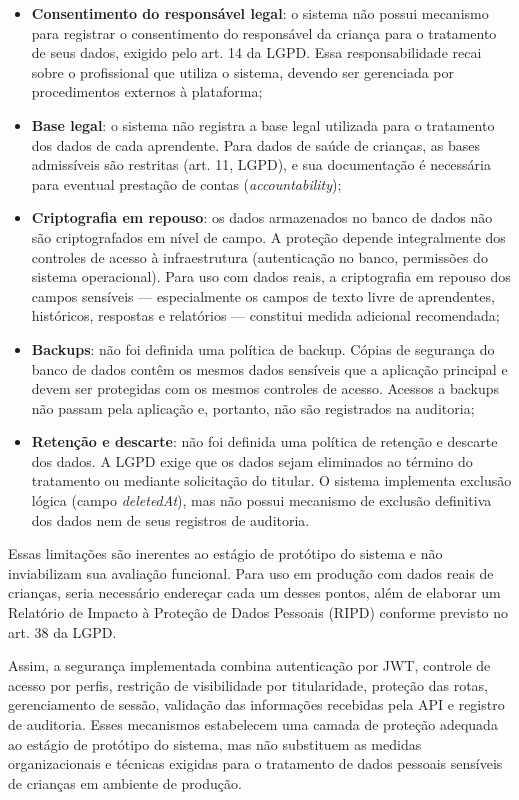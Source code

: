 \begin{itemize}
    \item \textbf{Consentimento do responsável legal}: o sistema não possui mecanismo para registrar o consentimento do responsável da criança para o tratamento de seus dados, exigido pelo art. 14 da LGPD. Essa responsabilidade recai sobre o profissional que utiliza o sistema, devendo ser gerenciada por procedimentos externos à plataforma;
    \item \textbf{Base legal}: o sistema não registra a base legal utilizada para o tratamento dos dados de cada aprendente. Para dados de saúde de crianças, as bases admissíveis são restritas (art. 11, LGPD), e sua documentação é necessária para eventual prestação de contas (\textit{accountability});
    \item \textbf{Criptografia em repouso}: os dados armazenados no banco de dados não são criptografados em nível de campo. A proteção depende integralmente dos controles de acesso à infraestrutura (autenticação no banco, permissões do sistema operacional). Para uso com dados reais, a criptografia em repouso dos campos sensíveis — especialmente os campos de texto livre de aprendentes, históricos, respostas e relatórios — constitui medida adicional recomendada;
    \item \textbf{Backups}: não foi definida uma política de backup. Cópias de segurança do banco de dados contêm os mesmos dados sensíveis que a aplicação principal e devem ser protegidas com os mesmos controles de acesso. Acessos a backups não passam pela aplicação e, portanto, não são registrados na auditoria;
    \item \textbf{Retenção e descarte}: não foi definida uma política de retenção e descarte dos dados. A LGPD exige que os dados sejam eliminados ao término do tratamento ou mediante solicitação do titular. O sistema implementa exclusão lógica (campo \textit{deletedAt}), mas não possui mecanismo de exclusão definitiva dos dados nem de seus registros de auditoria.
\end{itemize}

Essas limitações são inerentes ao estágio de protótipo do sistema e não inviabilizam sua avaliação funcional. Para uso em produção com dados reais de crianças, seria necessário endereçar cada um desses pontos, além de elaborar um Relatório de Impacto à Proteção de Dados Pessoais (RIPD) conforme previsto no art. 38 da LGPD.

Assim, a segurança implementada combina autenticação por JWT, controle de acesso por perfis, restrição de visibilidade por titularidade, proteção das rotas, gerenciamento de sessão, validação das informações recebidas pela API e registro de auditoria. Esses mecanismos estabelecem uma camada de proteção adequada ao estágio de protótipo do sistema, mas não substituem as medidas organizacionais e técnicas exigidas para o tratamento de dados pessoais sensíveis de crianças em ambiente de produção.